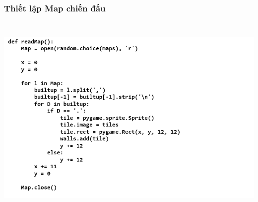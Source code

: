 \documentclass[a4paper]{article}
\begin{document}
\subsubsection{Thiết lập Map chiến đấu}
\includegraphics[width=6in,height=4in]{image48_1.png}
\end{document}

